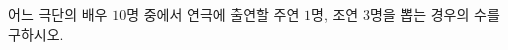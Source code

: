 \hspace*{2mm}\begin{minipage}[t]{\dimexpr\linewidth-2mm\relax}\vspace{0pt}
어느 극단의 배우 $10$명 중에서 연극에 출연할 주연 $1$명, 조연 $3$명을 뽑는 경우의 수를 구하시오.\end{minipage}
